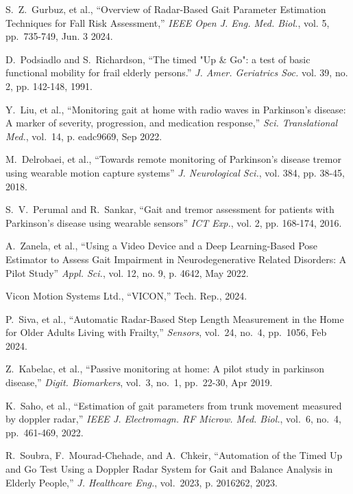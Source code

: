  S.~Z.~Gurbuz, et al., ``Overview of Radar-Based Gait Parameter Estimation Techniques for Fall Risk Assessment,'' \emph{IEEE Open J. Eng. Med. Biol.}, vol. 5, pp.~735-749, Jun. 3 2024.

 D.~Podsiadlo and S.~Richardson, ``The timed "Up \& Go": a test of basic functional mobility for frail elderly persons.'' \emph{J. Amer. Geriatrics Soc.} vol. 39, no. 2, pp. 142-148, 1991.

 Y.~Liu, et al., ``Monitoring gait at home with radio waves in Parkinson's disease: A marker of severity, progression, and medication response,'' \emph{Sci. Translational Med.}, vol.~14, p. eadc9669, Sep 2022.

 M.~Delrobaei, et al., ``Towards remote monitoring of Parkinson’s disease tremor using wearable motion capture systems'' \emph{J. Neurological Sci.}, vol. 384, pp. 38-45, 2018.

 S.~V.~Perumal and R.~Sankar, ``Gait and tremor assessment for patients with Parkinson’s disease using wearable sensors'' \emph{ICT Exp.}, vol. 2, pp. 168-174, 2016.

 A.~Zanela, et al., ``Using a Video Device and a Deep Learning-Based Pose Estimator to Assess Gait Impairment in Neurodegenerative Related Disorders: A Pilot Study'' \emph{Appl. Sci.}, vol. 12, no. 9, p. 4642, May 2022.

 Vicon Motion Systems Ltd., ``VICON,'' Tech. Rep., 2024.

 P.~Siva, et al., ``Automatic Radar-Based Step Length Measurement in the Home for Older Adults Living with Frailty,'' \emph{Sensors}, vol.~24, no.~4, pp.~1056, Feb 2024.

 Z.~Kabelac, et al., ``Passive monitoring at home: A pilot study in parkinson disease,'' \emph{Digit. Biomarkers}, vol.~3, no.~1, pp.~22-30, Apr 2019.


 K.~Saho, et al., ``Estimation of gait parameters from trunk movement measured by doppler radar,'' \emph{IEEE J. Electromagn. RF Microw. Med. Biol.}, vol.~6, no.~4, pp.~461-469, 2022.

 R.~Soubra, F.~Mourad-Chehade, and A.~Chkeir, ``Automation of the Timed Up and Go Test Using a Doppler Radar System for Gait and Balance Analysis in Elderly People,'' \emph{J. Healthcare Eng.}, vol.~2023, p. 2016262, 2023.


